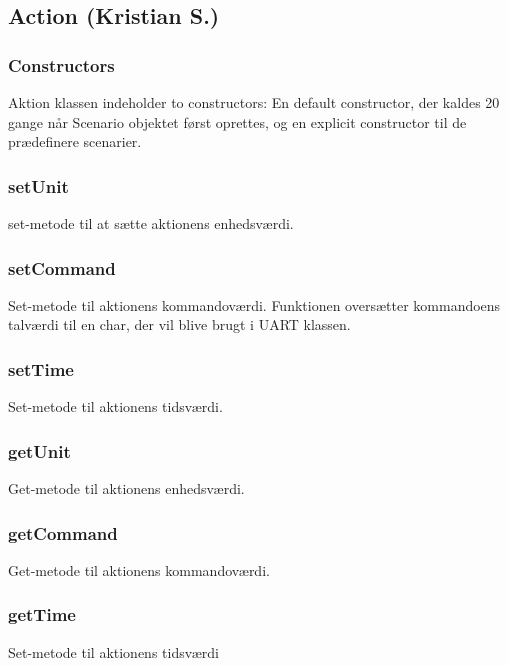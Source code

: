 \subsection{Action (Kristian S.)}

\subsubsection{Constructors}

Aktion klassen indeholder to constructors: En default constructor, der kaldes 20 gange når Scenario objektet først oprettes, og en explicit constructor til de prædefinere scenarier. 

\subsubsection{setUnit}

set-metode til at sætte aktionens enhedsværdi.

\subsubsection{setCommand}

Set-metode til aktionens kommandoværdi. Funktionen oversætter kommandoens talværdi til en char, der vil blive brugt i UART klassen.

\subsubsection{setTime}

Set-metode til aktionens tidsværdi.

\subsubsection{getUnit}

Get-metode til aktionens enhedsværdi.

\subsubsection{getCommand}

Get-metode til aktionens kommandoværdi.

\subsubsection{getTime}

Set-metode til aktionens tidsværdi


